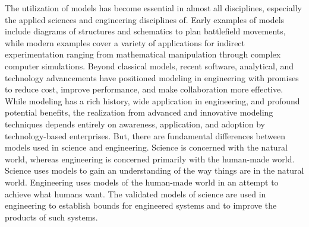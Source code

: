 The utilization of models has become essential in almost all disciplines, especially the applied sciences and engineering disciplines of. Early examples of models include diagrams of structures and schematics to plan battlefield movements, while modern examples cover a variety of applications for indirect experimentation ranging from mathematical manipulation through complex computer simulations.
Beyond classical models, recent software, analytical, and technology advancements have positioned modeling in engineering with promises to reduce cost, improve performance, and make collaboration more effective. While modeling has a rich history, wide application in engineering, and profound potential benefits, the realization from advanced and innovative modeling techniques depends entirely on awareness, application, and adoption by technology-based enterprises.
But, there are fundamental differences between models used in science and engineering. Science is concerned with the natural world, whereas engineering is concerned primarily with the human-made world. Science uses models to gain an understanding of the way things are in the natural world. Engineering uses models of the human-made world in an attempt to achieve what humans want. The validated models of science are used in engineering to establish bounds for engineered systems and to improve the products of such systems.